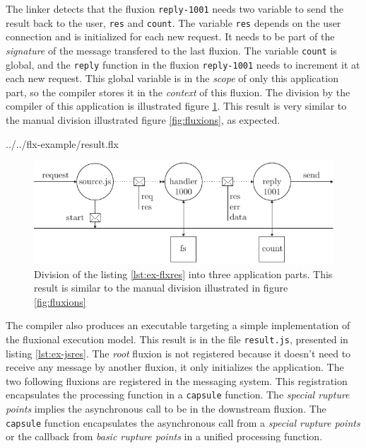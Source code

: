 The linker detects that the fluxion \texttt{reply-1001} needs two variable to send the result back to the user, \texttt{res} and \texttt{count}.
The variable \texttt{res} depends on the user connection and is initialized for each new request.
It needs to be part of the \textit{signature} of the message transfered to the last fluxion.
The variable \texttt{count} is global, and the \texttt{reply} function in the fluxion \texttt{reply-1001} needs to increment it at each new request.
This global variable is in the \textit{scope} of only this application part, so the compiler stores it in the \textit{context} of this fluxion.
The division by the compiler of this application is illustrated figure \ref{fig:flux-3}.
This result is very similar to the manual division illustrated figure \ref{fig:fluxions}, as expected.

{../../flx-example/result.flx}

\begin{figure}[h!]
\begin{center}
  \includegraphics[width=\linewidth]{ressources/flux-3.pdf}
  \caption{Division of the listing \ref{lst:ex-flxres} into three application parts. This result is similar to the manual division illustrated in figure \ref{fig:fluxions}}
  \label{fig:flux-3}
\end{center}
\end{figure}

The compiler also produces an executable targeting a simple implementation of the fluxional execution model.
This result is in the file \texttt{result.js}, presented in listing \ref{lst:ex-jsres}.
The \textit{root} fluxion is not registered because it doesn't need to receive any message by another fluxion, it only initializes the application.
The two following fluxions are registered in the messaging system.
This registration encapsulates the processing function in a \texttt{capsule} function.
The \textit{special rupture points} implies the asynchronous call to be in the downstream fluxion.
The \texttt{capsule} function encapsulates the asynchronous call from a \textit{special rupture points} or the callback from \textit{basic rupture points} in a unified processing function.

